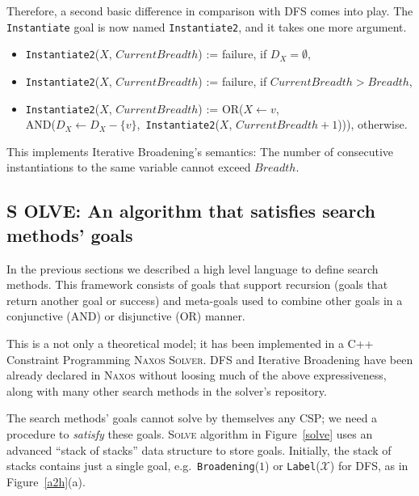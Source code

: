 \documentclass{ws-ijait}
\begin{document}
Therefore, a second basic difference in comparison with DFS
comes into play. The \texttt{Instantiate} goal is now named
\texttt{Instantiate2}, and it takes one more argument.
\begin{itemize}
  \item \texttt{Instantiate2}($X$,
                              $\mathit{CurrentBreadth}$) :=
          \textsf{failure},
          if $D_X = \emptyset$,
  \item \texttt{Instantiate2}($X$,
                              $\mathit{CurrentBreadth}$) :=
          \textsf{failure},
          if $\mathit{CurrentBreadth} > \mathit{Breadth}$,
  \item \texttt{Instantiate2}($X$,
                              $\mathit{CurrentBreadth}$) :=
          \textsf{OR}($X \! \gets \! v$, \\
            \textsf{AND}($D_X \!\! \gets \!\!
                D_X \!\! - \!\! \{v\}$,\,
              \texttt{Instantiate2}($X$,
                $\mathit{CurrentBreadth} + 1$))), otherwise.
\end{itemize}
This implements Iterative Broadening's semantics: The number
of consecutive instantiations to the same variable cannot
exceed $\mathit{Breadth}$.

\newcommand{\SolveNormal}{{\normalsize S\footnotesize OLVE}}

\newcommand{\Solve}{\textbf{\normalsize S\footnotesize
                            OLVE}}

\subsection{\Solve: An algorithm that satisfies search
            methods' goals}

In the previous sections we described a high level language
to define search methods. This framework consists of goals
that support recursion (goals that return another goal or
success) and meta-goals used to combine other goals in a
conjunctive (\textsf{AND}) or disjunctive (\textsf{OR})
manner.

This is a not only a theoretical model; it has been
implemented in a C++ Constraint Programming \textsc{Naxos
Solver}. DFS and Iterative Broadening have been already
declared in \textsc{Naxos} without loosing much of the above
expressiveness, along with many other search methods in the
solver's repository.\cite{Naxos}

The search methods' goals cannot solve by themselves any
CSP; we need a procedure to \emph{satisfy} these goals.
\textsc{Solve} algorithm in Figure~\ref{solve} uses an
advanced ``stack of stacks'' data structure to store goals.
Initially, the stack of stacks contains just a single goal,
e.g.\ \texttt{Broadening}($1$) or
\texttt{Label}($\mathscr{X}$) for DFS, as in
Figure~\ref{a2h}(a).
\end{document}
